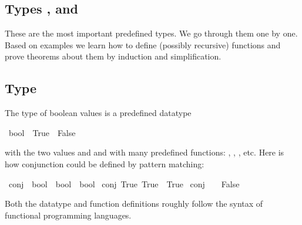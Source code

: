 %
\begin{isabellebody}%
\def\isabellecontext{Bool{\isaliteral{5F}{\isacharunderscore}}nat{\isaliteral{5F}{\isacharunderscore}}list}%
%
\isadelimtheory
%
\endisadelimtheory
%
\isatagtheory
%
\endisatagtheory
{\isafoldtheory}%
%
\isadelimtheory
%
\endisadelimtheory
%
\begin{isamarkuptext}%
\vspace{-4ex}
\section{\texorpdfstring{Types ,  and }{Types bool, nat and list}}

These are the most important predefined types. We go through them one by one.
Based on examples we learn how to define (possibly recursive) functions and
prove theorems about them by induction and simplification.

\subsection{Type }

The type of boolean values is a predefined datatype
\begin{isabelle}%
\ bool\ {}\ True\ {}\ False%
\end{isabelle}
with the two values  and  and
with many predefined functions:  , , ,  etc. Here is how conjunction could be defined by pattern matching:%
\end{isamarkuptext}%
\isamarkuptrue%
\isamarkupfalse%
\ conj\ {}{}\ {}bool\ {}\ bool\ {}\ bool{}\ \isanewline
{}conj\ True\ True\ {}\ True{}\ {}\isanewline
{}conj\ {}\ {}\ {}\ False{}%
\begin{isamarkuptext}%
Both the datatype and function definitions roughly follow the syntax
of functional programming languages.


\end{isamarkuptext}
\end{isabellebody}
